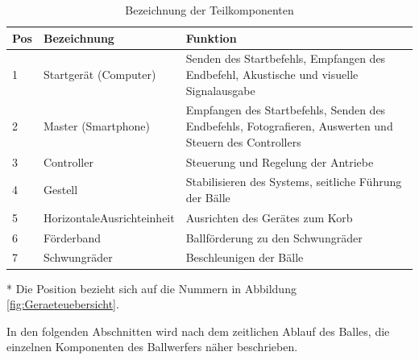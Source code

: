 \begin{table}[h!]
	\begin{threeparttable} 
		\begin{tabular}{p{8mm}p{3.5cm}p{8.1cm}}
		    \textbf{Pos}\tnote{*} & \textbf{Bezeichnung} & \textbf{Funktion} \\ 
			\hline\rule{0pt}{11pt} 1 & Startgerät (Computer) & Senden des Startbefehls, Empfangen des Endbefehl, 
			Akustische und visuelle Signalausgabe \\ 
			    \rule{0pt}{11pt}   2 & Master  (Smartphone) & Empfangen des Startbefehls, Senden des Endbefehls,
			Fotografieren, Auswerten und Steuern des Controllers \\ 
			  \rule{0pt}{11pt}     3 & Controller & Steuerung und Regelung der Antriebe \\ 
			  \rule{0pt}{11pt}     4 & Gestell & Stabilisieren des Systems,	seitliche Führung der Bälle \\ 
			   \rule{0pt}{11pt}    5 & Horizontale\newline Ausrichteinheit & Ausrichten des Gerätes zum Korb \\ 
			   \rule{0pt}{11pt}    6 & Förderband & Ballförderung zu den Schwungräder \\ 
			   \rule{0pt}{11pt}    7 & Schwungräder & Beschleunigen der Bälle \\ 
		\end{tabular} 
		\centering
		\caption{Bezeichnung der Teilkomponenten}	
		\label{tab:BezTeilkomponenten}
		\begin{tablenotes}\footnotesize 
			\item[*] Die Position bezieht sich auf die Nummern in Abbildung \ref{fig:Geraeteuebersicht}.
		\end{tablenotes}
	\end{threeparttable} 
\end{table}
\parindent 0pt In den folgenden Abschnitten wird nach dem zeitlichen Ablauf des Balles, 
die einzelnen Komponenten des Ballwerfers näher beschrieben. 